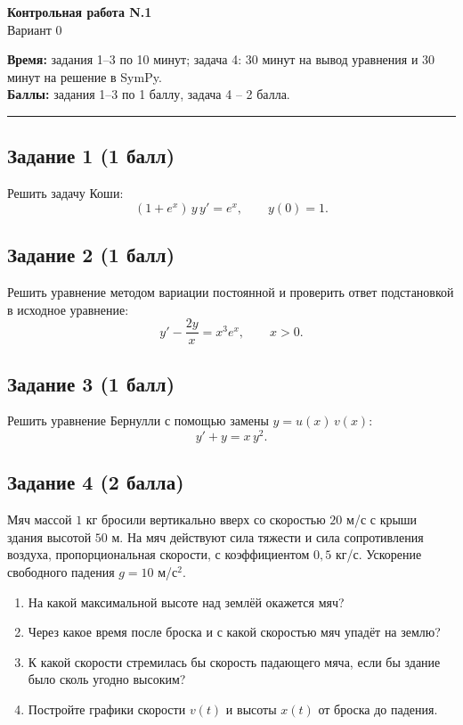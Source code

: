 \documentclass[12pt,a4paper]{article}
\begin{document}
\begin{center}
{\Large \textbf{Контрольная работа N.1}}\\[4pt]
Вариант 0
\end{center}

\textbf{Время:} задания 1--3 по 10 минут; задача 4: 30 минут на вывод уравнения и 30 минут на решение в SymPy.\\
\textbf{Баллы:} задания 1--3 по 1 баллу, задача 4 -- 2 балла.

\hrule

\subsection*{Задание 1 (1 балл)}
Решить задачу Коши:
\[
(1+e^x)\,y\,y' = e^x, \qquad y(0)=1.
\]

\subsection*{Задание 2 (1 балл)}
Решить уравнение методом вариации постоянной и проверить ответ подстановкой в исходное уравнение:
\[
y' - \frac{2y}{x} = x^3 e^x, \qquad x>0.
\]

\subsection*{Задание 3 (1 балл)}
Решить уравнение Бернулли с помощью замены $y=u(x)\,v(x)$:
\[
y' + y = x\,y^2.
\]

\subsection*{Задание 4 (2 балла)}
Мяч массой $1$ кг бросили вертикально вверх со скоростью $20$ м/с с крыши здания высотой $50$ м.
На мяч действуют сила тяжести и сила сопротивления воздуха, пропорциональная скорости, с коэффициентом $0{,}5$ кг/с.
Ускорение свободного падения $g=10$ м/с$^2$.

\begin{enumerate}
\item[а)] На какой максимальной высоте над землёй окажется мяч?
\item[б)] Через какое время после броска и с какой скоростью мяч упадёт на землю?
\item[в)] К какой скорости стремилась бы скорость падающего мяча, если бы здание было сколь угодно высоким?
\item[г)] Постройте графики скорости $v(t)$ и высоты $x(t)$ от броска до падения.
\end{enumerate}
\end{document}
